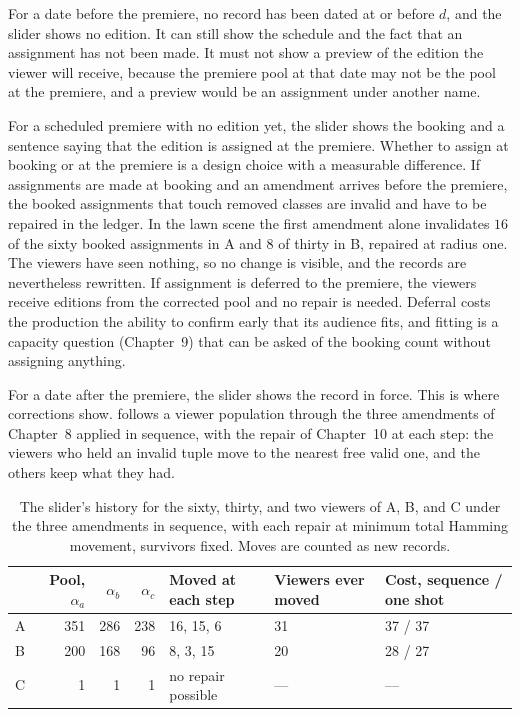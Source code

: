 \documentclass[11pt,twoside,openright]{book}
\theoremstyle{plain}
\theoremstyle{definition}
\theoremstyle{remark}
\begin{document}
For a date before the premiere, no record has been dated at or before $d$, and the slider shows no edition. It can still show the schedule and the fact that an assignment has not been made. It must not show a preview of the edition the viewer will receive, because the premiere pool at that date may not be the pool at the premiere, and a preview would be an assignment under another name.

For a scheduled premiere with no edition yet, the slider shows the booking and a sentence saying that the edition is assigned at the premiere. Whether to assign at booking or at the premiere is a design choice with a measurable difference. If assignments are made at booking and an amendment arrives before the premiere, the booked assignments that touch removed classes are invalid and have to be repaired in the ledger. In the lawn scene the first amendment alone invalidates $16$ of the sixty booked assignments in A and $8$ of thirty in B, repaired at radius one. The viewers have seen nothing, so no change is visible, and the records are nevertheless rewritten. If assignment is deferred to the premiere, the viewers receive editions from the corrected pool and no repair is needed. Deferral costs the production the ability to confirm early that its audience fits, and fitting is a capacity question (Chapter~9) that can be asked of the booking count without assigning anything.

For a date after the premiere, the slider shows the record in force. This is where corrections show.  follows a viewer population through the three amendments of Chapter~8 applied in sequence, with the repair of Chapter~10 at each step: the viewers who held an invalid tuple move to the nearest free valid one, and the others keep what they had.

\begin{table}[ht]
\centering
\begin{tabular}{@{}lrrrp{2.2cm}p{1.6cm}p{2.2cm}@{}}
\toprule
 & Pool, $\alpha_a$ & $\alpha_b$ & $\alpha_c$ & Moved at each step & Viewers ever moved & Cost, sequence / one shot\\
\midrule
A & 351 & 286 & 238 & 16, 15, 6 & 31 & 37 / 37\\
B & 200 & 168 & 96 & 8, 3, 15 & 20 & 28 / 27\\
C & 1 & 1 & 1 & no repair possible & --- & ---\\
\bottomrule
\end{tabular}
\caption{The slider's history for the sixty, thirty, and two viewers of A, B, and C under the three amendments in sequence, with each repair at minimum total Hamming movement, survivors fixed. Moves are counted as new records.}\label{tab:slider12}
\end{table}
\end{document}
